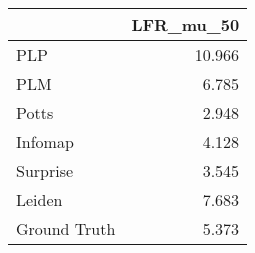 \begin{tabular}{lr}
\toprule
{} & LFR_mu_50 \\
\midrule
PLP          &    10.966 \\
PLM          &     6.785 \\
Potts        &     2.948 \\
Infomap      &     4.128 \\
Surprise     &     3.545 \\
Leiden       &     7.683 \\
Ground Truth &     5.373 \\
\bottomrule
\end{tabular}
